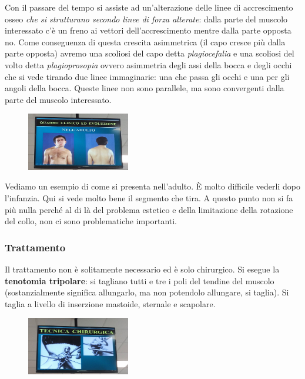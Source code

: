 Con il passare del tempo si assiste ad un'alterazione delle linee di accrescimento osseo \emph{che si strutturano secondo linee di forza alterate}: dalla parte del muscolo interessato c'è un freno ai vettori dell'accrescimento mentre dalla parte opposta no. Come conseguenza di questa crescita asimmetrica (il capo cresce più dalla parte opposta) avremo una scoliosi del capo detta \emph{plagiocefalia} e una scoliosi del volto detta \emph{plagioprosopia} ovvero asimmetria degli assi della bocca e degli occhi che si vede tirando due linee immaginarie: una che passa gli occhi e una per gli angoli della bocca. Queste linee non sono parallele, ma sono convergenti dalla parte del muscolo interessato.

\begin{figure}[!ht]
\centering
\includegraphics[width=0.4\textwidth]{013/image27.jpeg}
\end{figure}

Vediamo un esempio di come si presenta nell'adulto. È molto difficile vederli dopo l'infanzia. Qui si vede molto bene il segmento che tira. A questo punto non si fa più nulla perché al di là del problema estetico e della limitazione della rotazione del collo, non ci sono problematiche
importanti.

\subsubsection{Trattamento}

Il trattamento non è solitamente necessario ed è solo chirurgico. Si esegue la \textbf{tenotomia tripolare}: si tagliano tutti e tre i poli del tendine del muscolo (sostanzialmente significa allungarlo, ma non potendolo allungare, si taglia). Si taglia a livello di inserzione
mastoide, sternale e scapolare.

\begin{figure}[!ht]
\centering
\includegraphics[width=0.4\textwidth]{013/image28.jpeg}
\end{figure}

